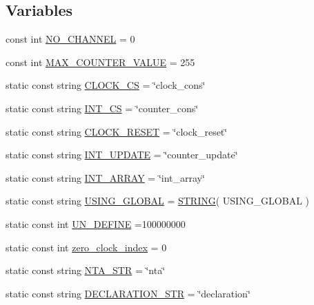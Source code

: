 \subsection*{Variables}
\begin{DoxyCompactItemize}
\item 
const int \mbox{\hyperlink{namespacegraphsat_afb1fe79544f9b39dfe8d4555265e0a3a}{N\+O\+\_\+\+C\+H\+A\+N\+N\+EL}} = 0
\item 
const int \mbox{\hyperlink{namespacegraphsat_a028a33caa1e67ceff71bcddcf85065c9}{M\+A\+X\+\_\+\+C\+O\+U\+N\+T\+E\+R\+\_\+\+V\+A\+L\+UE}} = 255
\item 
static const string \mbox{\hyperlink{namespacegraphsat_ac1a59dee39d9461d2d0e65ce48b6040a}{C\+L\+O\+C\+K\+\_\+\+CS}} = \char`\"{}clock\+\_\+cons\char`\"{}
\item 
static const string \mbox{\hyperlink{namespacegraphsat_aaa36524ae9402c1f545ae4014ed1078f}{I\+N\+T\+\_\+\+CS}} = \char`\"{}counter\+\_\+cons\char`\"{}
\item 
static const string \mbox{\hyperlink{namespacegraphsat_a655d5fb01c04627faadab08ad35c5551}{C\+L\+O\+C\+K\+\_\+\+R\+E\+S\+ET}} = \char`\"{}clock\+\_\+reset\char`\"{}
\item 
static const string \mbox{\hyperlink{namespacegraphsat_a9fcee653cf14e79e25c2ac4483847ffd}{I\+N\+T\+\_\+\+U\+P\+D\+A\+TE}} = \char`\"{}counter\+\_\+update\char`\"{}
\item 
static const string \mbox{\hyperlink{namespacegraphsat_a4760643c6d5dd8f207502e93a8a83f37}{I\+N\+T\+\_\+\+A\+R\+R\+AY}} = \char`\"{}int\+\_\+array\char`\"{}
\item 
static const string \mbox{\hyperlink{namespacegraphsat_a483442a80bab39b2da13ccdd04e4cf3d}{U\+S\+I\+N\+G\+\_\+\+G\+L\+O\+B\+AL}} = \mbox{\hyperlink{data_8hpp_a8f7bd5242b15da973671df869db5fe85}{S\+T\+R\+I\+NG}}( U\+S\+I\+N\+G\+\_\+\+G\+L\+O\+B\+AL )
\item 
static const int \mbox{\hyperlink{namespacegraphsat_ac495a5bfce375af1b4d9a8e3f75bef9e}{U\+N\+\_\+\+D\+E\+F\+I\+NE}} =100000000
\item 
static const int \mbox{\hyperlink{namespacegraphsat_a3a7778675bb2df267cba6672151335e7}{zero\+\_\+clock\+\_\+index}} = 0
\item 
static const string \mbox{\hyperlink{namespacegraphsat_ad0c8e800110eeafa3c4888b686b95b45}{N\+T\+A\+\_\+\+S\+TR}} = \char`\"{}nta\char`\"{}
\item 
static const string \mbox{\hyperlink{namespacegraphsat_a78d25c802b5c0846a37c41fb872959ab}{D\+E\+C\+L\+A\+R\+A\+T\+I\+O\+N\+\_\+\+S\+TR}} = \char`\"{}declaration\char`\"{}

\end{DoxyCompactItemize}
